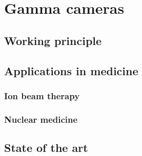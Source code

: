 \chapter{Gamma cameras}\label{chap::2}

\vfill

\minitoc

\newpage


\section{Working principle}

\section{Applications in medicine}

\subsection{Ion beam therapy}

\subsection{Nuclear medicine}


\section{State of the art}

\clearpage

